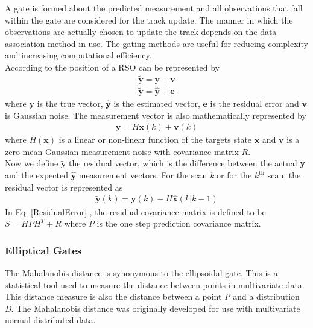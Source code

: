 \documentclass[]{aiaa-tc}%
\begin{document}
A gate is formed about the predicted measurement and all observations that fall within the gate are considered for the track update. The manner in which the observations are actually chosen to update the track depends on the data association method in use. The gating methods are useful for reducing complexity and increasing computational efficiency. \\

According to \cite{crassidis_optimal_2011} the position of a RSO can be represented by
\begin{align*}
\tilde{\textbf{y}} = \textbf{y} + \textbf{v} \\
\tilde{\textbf{y}} = \hat{\textbf{y}} + \textbf{e}
\end{align*}
where $\textbf{y}$ is the true vector, $\hat{\textbf{y}}$ is the estimated vector, $\textbf{e}$ is the residual error and $\textbf{v}$ is Gaussian noise. The measurement vector is also mathematically represented by
\begin{align}
\label{MsmtEqn}
\textbf{y} = H\textbf{x}(k) + \textbf{v}(k)
\end{align}
where $H(\textbf{x})$ is a linear or non-linear function of the targets state $\textbf{x}$ and $\textbf{v}$ is a zero mean Gaussian measurement noise with covariance matrix $R$.\\

Now we define $\tilde{\textbf{y}}$ the residual vector, which is the difference between the actual \textbf{y} and the expected $\hat{\textbf{y}}$ measurement vectors. For the scan \textit{k} or for the $k^{\text{th}}$ scan, the residual vector is represented as
\begin{align}
\label{ResidualError}
\tilde{\textbf{y}}(k) = \textbf{y}(k) - H\hat{\textbf{x}}(k|k-1) 
\end{align}
In Eq. \eqref{ResidualError} , the residual covariance matrix is defined to be $S = HPH^T + R$ where $P$ is the one step prediction covariance matrix.

\subsubsection{Elliptical Gates}

The Mahalanobis distance is synonymous to the ellipsoidal gate. This is a statistical tool used to measure the distance between points in multivariate data. This distance measure is also the distance between a point \textit{P} and a distribution \textit{D}. The Mahalanobis distance was originally developed for use with multivariate normal distributed data.\\
\end{document}
